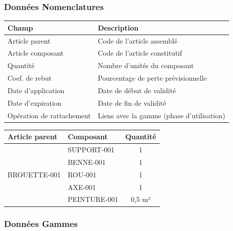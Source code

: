 \documentclass{article}
\begin{document}
\begin{table}[h]
\subsubsection{Données Nomenclatures}

\begin{table}[h]
\centering
\begin{tabular}{|p{}|p{}|}
\hline
\textbf{Champ} & \textbf{Description} \\
\hline
Article parent & Code de l'article assemblé \\
Article composant & Code de l'article constitutif \\
Quantité & Nombre d'unités du composant \\
Coef. de rebut & Pourcentage de perte prévisionnelle \\
Date d'application & Date de début de validité \\
Date d'expiration & Date de fin de validité \\
Opération de rattachement & Liens avec la gamme (phase d'utilisation) \\
\hline
\end{tabular}
\end{table}

\begin{tcolorbox}[colback=grisclair, colframe=gray!70!black, title=Exemple : Nomenclature de production - Brouette]
\begin{tabular}{|l|l|c|}
\hline
\textbf{Article parent} & \textbf{Composant} & \textbf{Quantité} \\
\hline
\multirow{5}{*}{BROUETTE-001} & SUPPORT-001 & 1 \\
 & BENNE-001 & 1 \\
 & ROU-001 & 1 \\
 & AXE-001 & 1 \\
 & PEINTURE-001 & 0,5 m² \\
\hline
\end{tabular}
\end{tcolorbox}

\subsubsection{Données Gammes}


\end{table}
\end{document}
